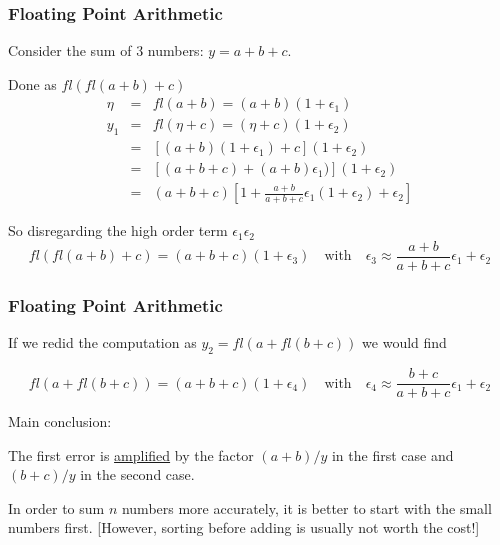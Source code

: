 \documentclass[10pt]{beamer}
\begin{document}
\begin{frame}
\frametitle{Floating Point Arithmetic}
Consider the sum of 3 numbers: $y = a + b + c $.

\bigskip
Done as $ fl( fl(a+b) + c) $
\begin{eqnarray*} 
\eta & = & fl(a+b) = (a+b)(1+\epsilon_1) \\
y_1  & = & fl( \eta+ c) =  (\eta+c)(1+\epsilon_2) \\
     & = & \left[ (a+b)(1+\epsilon_1)   +c \right] (1+\epsilon_2) \\ 
     & = & \left[ (a+b +c) + (a+b) \epsilon_1)  \right] (1+\epsilon_2) \\ 
     & = &  (a+b +c) \left[1 + \frac{a+b}{a+b+c} \epsilon_1
(1+\epsilon_2) + \epsilon_2
  \right]
\end{eqnarray*}

So disregarding the high order term $\epsilon_1 \epsilon_2 $ 
\[ fl( fl(a+b) + c) = (a+b+c) (1 + \epsilon_3) 
\quad \mbox{with} \quad \epsilon_3 \approx \frac{a+b}{a+b+c} \epsilon_1 +
\epsilon_2\]
\end{frame}
\begin{frame}
\frametitle{Floating Point Arithmetic}


If we redid the computation as $ y_2 = fl( a + fl(b+c)) $
we would find 

\[
fl( a + fl(b+c)) = (a+b+c) (1 + \epsilon_4) 
\quad \mbox{with} \quad \epsilon_4 \approx \frac{b+c}{a+b+c} \epsilon_1
+ \epsilon_2\]

Main conclusion:
\bigskip

The first error is \underline{amplified} by the factor $(a+b)/y$ in the
first case and $(b+c)/y$ in the second case. 

\bigskip
In order to sum
 $n$ numbers more accurately, it is better to start with the small
 numbers first. [However, sorting before adding is usually not worth the cost!] 
\end{frame}
\end{document}
